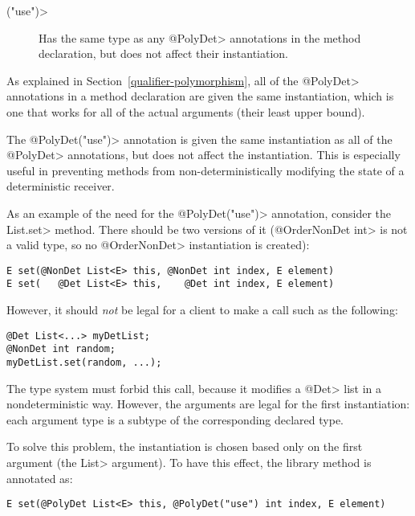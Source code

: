 
\begin{description}
\item[\<("use")>]
  Has the same type as any \<@PolyDet> annotations in the method
  declaration, but does not affect their instantiation.
\end{description}

As explained in Section~\ref{qualifier-polymorphism},
all of the \<@PolyDet> annotations in a method declaration are given the same
instantiation, which is one that works for all of the actual arguments
(their least upper bound).

The \<@PolyDet("use")> annotation is given the same instantiation as all of the
\<@PolyDet> annotations, but does not affect the instantiation. This is especially
useful in preventing methods from non-deterministically modifying the
state of a deterministic receiver.

As an example of the need for the \<@PolyDet("use")> annotation, consider the
\<List.set> method.  There should be two versions of it (\<@OrderNonDet
int> is not a valid type, so no \<@OrderNonDet> instantiation is created):

\begin{Verbatim}
E set(@NonDet List<E> this, @NonDet int index, E element)
E set(   @Det List<E> this,    @Det int index, E element)
\end{Verbatim}

\noindent
However, it should \emph{not} be legal for a client to make a call such as
the following:

\begin{Verbatim}
@Det List<...> myDetList;
@NonDet int random;
myDetList.set(random, ...);
\end{Verbatim}

\noindent
The type system must forbid this call, because it modifies a
\<@Det> list in a nondeterministic way.
However, the arguments are legal for the first instantiation:
each argument type is a subtype of the corresponding declared type.

To solve this problem, the instantiation is chosen based only on the first
argument (the \<List> argument).  To have this effect, the library method
is annotated as:

\begin{Verbatim}
E set(@PolyDet List<E> this, @PolyDet("use") int index, E element)
\end{Verbatim}

